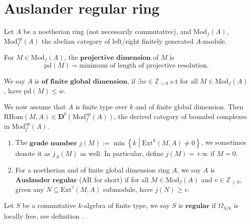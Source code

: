 \section{Auslander regular ring}
Let $A$ be a noetherian ring (not necessarily commutative), and $\mathrm{Mod}_{f}(A)$, $\mathrm{Mod}_{f}^{op}(A)$ the abelian category of left/right finitely generated $A$-module.

For $M \in \mathrm{Mod}_{f}(A)$, the $\textbf{projective dimension}$ of $M$ is
$$\mathrm{pd}(M) = \text{minimum of length of projective resolution.}$$

We say $A$ is $\textbf{of finite global dimension}$, if $\exists w \in \mathbb{Z}_{>0}$ s.t for all $M \in \mathrm{Mod}_{f}(A)$, have $\mathrm{pd}(M) \le w$.

We now assume that $A$ is finite type over $k$ and of finite global dimension. Then $\mathrm{RHom}(M,A) \in \mathbf{D}^{b}(\mathrm{Mod}^{op}_{f}(A))$, the derived category of bounded complexes in $\mathrm{Mod}_{f}^{op}(A)$.

\begin{definition}
    \quad
    \begin{enumerate}
        \item The $\textbf{grade number}$ $j(M) := \min\left\{k \middle| \mathrm{Ext}^{k}(M,A) \neq 0\right\}$, we sometimes denote it as  $j_{A}(M)$ as well. In particular, define $j(M) = +\infty$ if $M = 0$.
        \item For a noetherian and of finite global dimension ring $A$, we say $A$ is $\textbf{Auslander regular}$ (AR for short) if for all $M \in \mathrm{Mod}_{f}(A)$ and $v \in \mathbb{Z}_{\ge 0}$, given any $N \subseteq \mathrm{Ext}^{v}(M,A)$ submodule, have $j(N) \ge v$.
    \end{enumerate}
\end{definition}

Let $S$ be a commutative $k$-algebra of finite type, we say $S$ is $\textbf{regular}$ if $\Omega_{S/k}$ is locally free, see definition \cite[\href{https://stacks.math.columbia.edu/tag/00OD}{Tag 00OD}]{stacks-project}.

